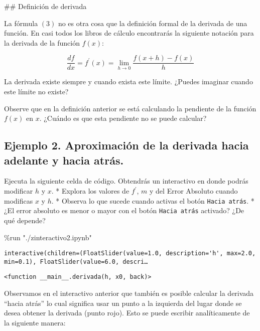 \documentclass[
  letterpaper,
  DIV=11,
  numbers=noendperiod]{scrreprt}
\newenvironment{Shaded}{\begin{snugshade}}{\end{snugshade}}
\newcommand{\NormalTok}[1]{\textcolor[rgb]{0.00,0.23,0.31}{#1}}
\newcommand{\OperatorTok}[1]{\textcolor[rgb]{0.37,0.37,0.37}{#1}}
\newcommand{\StringTok}[1]{\textcolor[rgb]{0.13,0.47,0.30}{#1}}
\begin{document}
\#\# Definición de derivada

La fórmula \((3)\) no es otra cosa que la definición formal de la
derivada de una función. En casi todos los libros de cálculo encontrarás
la siguiente notación para la derivada de la función \(f(x)\):

\[ 
\frac{d f}{dx} = f^\prime(x)=\lim_{h \to 0} \frac{f(x + h) - f(x)}{h} \tag{5}
\]

La derivada existe siempre y cuando exista este límite. ¿Puedes imaginar
cuando este límite no existe?

Observe que en la definición anterior se está calculando la pendiente de
la función \(f(x)\) en \(x\). ¿Cuándo es que esta pendiente no se puede
calcular?

\subsection{Ejemplo 2. Aproximación de la derivada hacia adelante y
hacia
atrás.}\label{ejemplo-2.-aproximaciuxf3n-de-la-derivada-hacia-adelante-y-hacia-atruxe1s.}

Ejecuta la siguiente celda de código. Obtendrás un interactivo en donde
podrás modificar \(h\) y \(x\). * Explora los valores de \(f^\prime\),
\(m\) y del Error Absoluto cuando modificas \(x\) y \(h\). * Observa lo
que sucede cuando activas el botón \texttt{Hacia\ atrás}. * ¿El error
absoluto es menor o mayor con el botón \texttt{Hacia\ atrás} activado?
¿De qué depende?

\begin{Shaded}
\begin{Highlighting}[]
\OperatorTok{\%}\NormalTok{run }\StringTok{"./zinteractivo2.ipynb"}
\end{Highlighting}
\end{Shaded}

\begin{verbatim}
interactive(children=(FloatSlider(value=1.0, description='h', max=2.0, min=0.1), FloatSlider(value=6.0, descri…
\end{verbatim}

\begin{verbatim}
<function __main__.derivada(h, x0, back)>
\end{verbatim}

Observamos en el interactivo anterior que también es posible calcular la
derivada ``hacia atrás'' lo cual significa usar un punto a la izquierda
del lugar donde se desea obtener la derivada (punto rojo). Esto se puede
escribir analíticamente de la siguiente manera:
\end{document}
